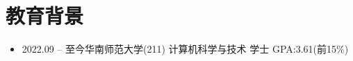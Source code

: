 \section{教育背景}
\begin{normalsize}
  \begin{itemize}[parsep=0.5ex]
    \item {2022.09 -- 至今}\hspace{0.8cm}华南师范大学(211)  \hspace{0.8cm} 计算机科学与技术 \hspace{0.8cm} 学士 \hspace{0.8cm} GPA:3.61(前15\%)
  \end{itemize}
\end{normalsize}